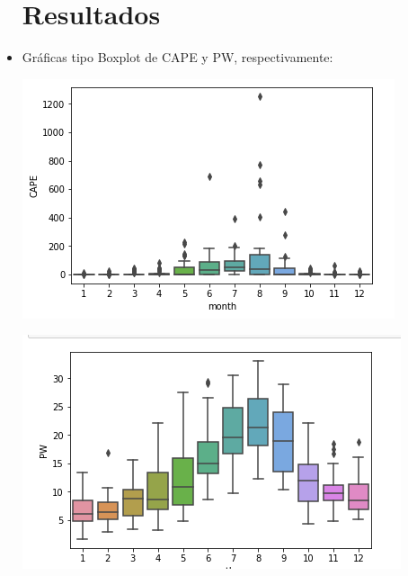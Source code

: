 \documentclass{article}
\begin{document}
\begin{doublespace}
\begin{itemize}
\section{Resultados}
\item Gráficas tipo Boxplot de CAPE y PW, respectivamente: 
\\
\begin{center}
\includegraphics[scale=0.5]{act57.png}
\end{center}
\begin{center}
\includegraphics[scale=0.5]{act58.png}
\end{center}


\end{itemize}
\end{doublespace}
\end{document}
